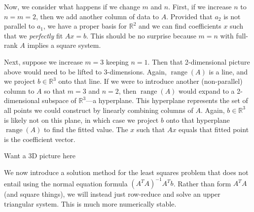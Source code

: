 \documentclass[12pt]{article}
\numberwithin{equation}{section} %
\theoremstyle{plain}
\theoremstyle{definition}
\theoremstyle{remark}
\newcommand{\R}{\mathbb{R}}
\newcommand{\range}{\operatorname{range}}
\begin{document}
\clearpage
Now, we consider what happens if we change $m$ and $n$. First, if we
increase $n$ to $n=m=2$, then we add another column of data to $A$.
Provided that $a_2$ is not parallel to $a_1$, we have a proper basis for
$\R^2$ and we can find coefficients $x$ such that we \emph{perfectly}
fit $Ax=b$. This should be no surprise because $m=n$ with full-rank $A$
implies a square system.

Next, suppose we increase $m=3$ keeping $n=1$. Then that 2-dimensional
picture above would need to be lifted to 3-dimensions. Again,
$\range(A)$ is a line, and we project $b\in\R^3$ onto that line. If we
were to introduce another (non-parallel) column to $A$ so that $m=3$ and
$n=2$, then $\range(A)$ would expand to a 2-dimensional subspace of
$\R^3$---a hyperplane. This hyperplane represents the set of all points
we could construct by linearly combining columns of $A$. Again,
$b\in\R^3$ is likely not on this plane, in which case we project $b$
onto that hyperplane $\range(A)$ to find the fitted value. The $x$ such
that $Ax$ equals that fitted point is the coefficient vector.

Want a 3D picture here

We now introduce a solution method for the least squares problem that
does not entail using the normal equation formula $(A^TA)^{-1}A^Tb$.
Rather than form $A^TA$ (and square things), we will instead just
row-reduce and solve an upper triangular system. This is much more
numerically stable.
\end{document}
